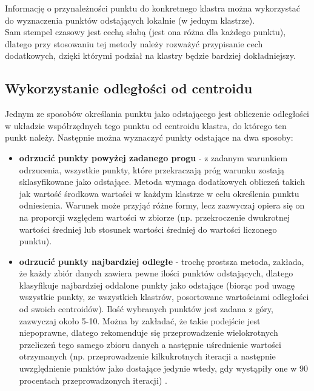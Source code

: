\documentclass[eng,printmode]{mgr}
\begin{document}
Informację o przynależności punktu do konkretnego klastra można wykorzystać do wyznaczenia punktów odstających lokalnie (w jednym klastrze). \\
Sam stempel czasowy jest cechą słabą (jest ona różna dla każdego punktu), dlatego przy stosowaniu tej metody należy rozważyć przypisanie cech dodatkowych, dzięki którymi podział na klastry będzie bardziej dokładniejszy.
\subsection{Wykorzystanie odległości od centroidu}
Jednym ze sposobów określania punktu jako odstającego jest obliczenie odległości w układzie współrzędnych tego punktu od centroidu klastra, do którego ten punkt należy. Następnie można wyznaczyć punkty odstające na dwa sposoby:
\begin{itemize}
\item \textbf{odrzucić punkty powyżej zadanego progu} - z zadanym warunkiem odrzucenia, wszystkie punkty, które przekraczają próg warunku zostają sklasyfikowane jako odstające. Metoda wymaga dodatkowych obliczeń takich jak wartość środkowa wartości w każdym klastrze w celu określenia punktu odniesienia. Warunek może przyjąć różne formy, lecz zazwyczaj opiera się on na proporcji względem wartości w zbiorze (np. przekroczenie dwukrotnej wartości średniej lub stosunek wartości średniej do wartości liczonego punktu).
\item \textbf{odrzucić punkty najbardziej odległe} - trochę prostsza metoda, zakłada, że każdy zbiór danych zawiera pewne ilości punktów odstających, dlatego klasyfikuje najbardziej oddalone punkty jako odstające (biorąc pod uwagę wszystkie punkty, ze wszystkich klastrów, posortowane wartościami odległości od swoich centroidów). Ilość wybranych punktów jest zadana z góry, zazwyczaj około 5-10. Można by zakładać, że takie podejście jest niepoprawne, dlatego rekomenduje się przeprowadzenie wielokrotnych przeliczeń tego samego zbioru danych a następnie uśrednienie wartości otrzymanych (np. przeprowadzenie kilkukrotnych iteracji a następnie uwzględnienie punktów jako dostające jedynie wtedy, gdy wystąpiły one w 90 procentach przeprowadzonych iteracji)  \cite{kmean_dist}. 
\end{itemize}
\end{document}

